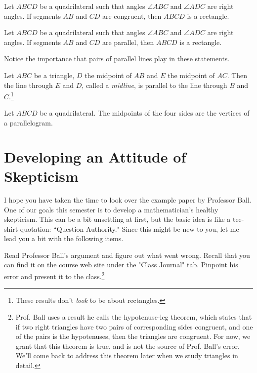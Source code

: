 \begin{conjecture}\label{conj:opp-congruent-implies-rectangle}
Let $ABCD$ be a quadrilateral such that angles $\angle ABC$ and $\angle ADC$ are right angles.
If segments $AB$ and $CD$ are congruent, then $ABCD$ is a rectangle.
\end{conjecture}

\begin{conjecture}\label{conj:opp-parallel-implies-rectangle}
Let $ABCD$ be a quadrilateral such that angles $\angle ABC$ and $\angle ADC$ are right angles.
If segments $AB$ and $CD$ are parallel, then $ABCD$ is a rectangle.
\end{conjecture}

Notice the importance that pairs of parallel lines play in these statements.



\begin{conjecture} \label{conj:midline-theorem}
Let $ABC$ be a triangle, $D$ the midpoint of $AB$ and $E$ the midpoint of $AC$.
Then the line through $E$ and $D$, called a \emph{midline}, is parallel to the line through $B$ and $C$.\footnote{These results don't \emph{look} to be about rectangles.}

\end{conjecture}

\begin{conjecture}\label{conj:Varignon}
Let $ABCD$ be a quadrilateral. The midpoints of the four sides are the vertices of a parallelogram.
\end{conjecture}




\chapter{Developing an Attitude of Skepticism}

I hope you have taken the time to look over the example paper by Professor Ball.
One of our goals this semester is to develop a mathematician's healthy skepticism.
This can be a bit unsettling at first, but the basic idea is like a tee-shirt quotation: ``Question Authority."
Since this might be new to you, let me lead you a bit with the following items.

\begin{problem}\label{prob:Ball}
Read Professor Ball's argument and figure out what went wrong.
Recall that you can find it on the course web site under the "Class Journal" tab.
Pinpoint his error and present it to the class.\footnote{Prof. Ball uses a result he calls the hypotenuse-leg theorem, which states that if two right triangles have two pairs of corresponding sides congruent, and one of the pairs is the hypotenuses, then the triangles are congruent. For now, we grant that this theorem is true, and is not the source of Prof. Ball's error. We'll come back to address this theorem later when we study triangles in detail.}
\end{problem}

